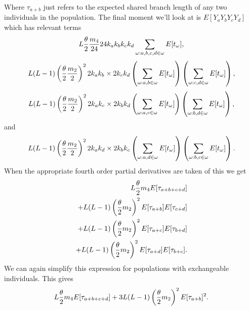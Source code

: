Where $\tau_{a+b}$ just refers to the expected shared branch length of any two
individuals in the population. The final moment we'll look at is
$E[Y_aY_bY_cY_d]$ which has relevant terms
\begin{equation*}
  L \frac{\theta}{2} \frac{m_4}{24} 24k_ak_bk_ck_d \sum_{\omega: a,b,c,d \in \omega} E[t_\omega],
\end{equation*}
\begin{equation*}
  L(L-1) \left(\frac{\theta}{2} \frac{m_2}{2}\right)^2 2k_ak_b \times 2k_ck_d \left( \sum_{\omega: a,b \in \omega} E[t_\omega] \right)
  \left( \sum_{\omega: c,d \in \omega} E[t_\omega] \right),
\end{equation*}
\begin{equation*}
  L(L-1) \left(\frac{\theta}{2} \frac{m_2}{2}\right)^2 2k_ak_c \times 2k_bk_d \left( \sum_{\omega: a,c \in \omega} E[t_\omega] \right)
  \left( \sum_{\omega: b,d \in \omega} E[t_\omega] \right),
\end{equation*}
and
\begin{equation*}
  L(L-1) \left(\frac{\theta}{2} \frac{m_2}{2}\right)^2 2k_ak_d \times 2k_bk_c \left( \sum_{\omega: a,d \in \omega} E[t_\omega] \right)
  \left( \sum_{\omega: b,c \in \omega} E[t_\omega] \right).
\end{equation*}
When the appropriate fourth order partial derivatives are taken of this we get
\begin{align*}
  L \frac{\theta}{2} m_4 E[\tau_{a+b+c+d}] \\
  + L(L-1)\left(\frac{\theta}{2} m_2\right)^2E[\tau_{a+b}]E[\tau_{c+d}] \\
  + L(L-1)\left(\frac{\theta}{2} m_2\right)^2E[\tau_{a+c}]E[\tau_{b+d}] \\
  + L(L-1)\left(\frac{\theta}{2} m_2\right)^2E[\tau_{a+d}]E[\tau_{b+c}].
\end{align*}
We can again simplify this expression for populations with exchangeable
individuals. This gives
\begin{equation}
  \label{eq:m1111}
  L \frac{\theta}{2} m_4 E[\tau_{a+b+c+d}] + 3L(L-1)\left(\frac{\theta}{2} m_2\right)^2E[\tau_{a+b}]^2.
\end{equation}

